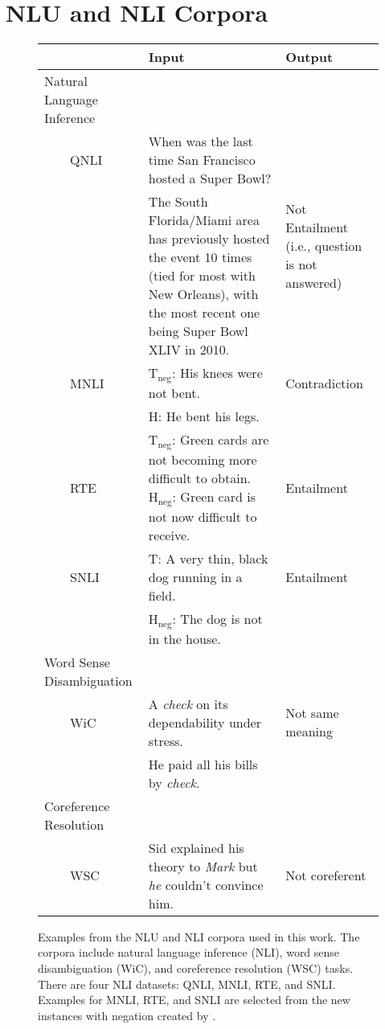 \section{NLU and NLI Corpora}
\label{sec:nlunlicorpora}
\begin{figure*}
\small
\centering
    \begin{tabularx}{\textwidth}{lXp{1.25in}} 
        \toprule
        & Input & Output \\
        \midrule
        Natural Language Inference \\
        ~~~~QNLI & When was the last time San Francisco hosted a Super Bowl? & \multirow{2}{1.25in}{Not Entailment (i.e., question is not answered)} \\
        & The South Florida/Miami area has previously hosted the event 10 times (tied for most with New Orleans), with the most recent one being Super Bowl XLIV in 2010. \\
        ~~~~MNLI & $\text{T}_\text{neg}$: His knees were not bent. & Contradiction \\
        & H: He bent his legs. & \\
        ~~~~RTE & $\text{T}_\text{neg}$: Green cards are not becoming more difficult to obtain. $\text{H}_\text{neg}$: Green card is not now difficult to receive. & Entailment \\
        ~~~~SNLI & T: A very thin, black dog running in a field.  & Entailment \\
        & $\text{H}_\text{neg}$: The dog is not in the house.& \\   
        \midrule
        Word Sense Disambiguation \\
        ~~~~WiC & A \emph{check} on its dependability under stress. & Not same meaning \\
        & He paid all his bills by \emph{check}. \\
        \midrule
        Coreference Resolution \\
        ~~~~WSC & Sid explained his theory to \emph{Mark} but \emph{he} couldn't convince him. & Not coreferent \\
        \bottomrule
        \end{tabularx}
        \caption{
            \label{tab:nlu/icorpora}
            Examples from the NLU and NLI corpora used in this work.
            The corpora include natural language inference (NLI), word sense disambiguation (WiC), and coreference resolution (WSC) tasks.
            There are four NLI datasets: QNLI, MNLI, RTE, and SNLI.
            Examples for MNLI, RTE, and SNLI are selected from the new instances with negation created by \citet{hossain-etal-2020-analysis}.
        }
\end{figure*}
